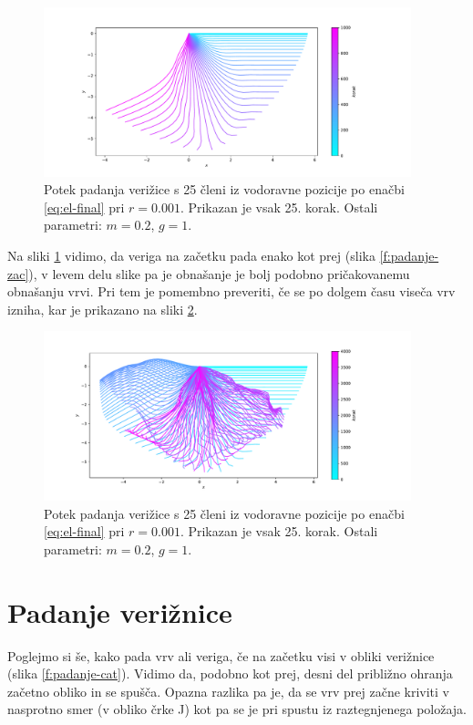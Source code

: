 \documentclass[a4paper, 12pt, slovene]{article}
\numberwithin{equation}{section}
\begin{document}
\begin{figure}[H]
\centering
\includegraphics[width=0.95\textwidth]{grafi/padvrv-popR-n25-l0.24-m0.2-r0.001-dt0.01-t10.0-freq25.pdf}
\caption{Potek padanja verižice s 25 členi iz vodoravne pozicije po enačbi \eqref{eq:el-final} pri $r=0.001$. Prikazan je vsak 25. korak. Ostali parametri: $m=0.2$, $g=1$.}
\label{f:padanje-r}
\end{figure}

Na sliki \ref{f:padanje-r} vidimo, da veriga na začetku pada enako kot prej (slika \ref{f:padanje-zac}), v levem delu slike pa je obnašanje je bolj podobno pričakovanemu obnašanju vrvi. Pri tem je pomembno preveriti, če se po dolgem času viseča vrv izniha, kar je prikazano na sliki \ref{f:padanje-izniha}.

\begin{figure}[H]
\centering
\includegraphics[width=0.95\textwidth]{grafi/padvrv-popR-n25-l0.24-m0.2-dt0.01-t10.0-freq25.pdf}
\caption{Potek padanja verižice s 25 členi iz vodoravne pozicije po enačbi \eqref{eq:el-final} pri $r=0.001$. Prikazan je vsak 25. korak. Ostali parametri: $m=0.2$, $g=1$.}
\label{f:padanje-izniha}
\end{figure}





\section{Padanje verižnice}
Poglejmo si še, kako pada vrv ali veriga, če na začetku visi v obliki verižnice (slika \ref{f:padanje-cat}). Vidimo da, podobno kot prej, desni del približno ohranja začetno obliko in se spušča. Opazna razlika pa je, da se vrv prej začne kriviti v nasprotno smer (v obliko črke J) kot pa se je pri spustu iz raztegnjenega položaja.
\end{document}
